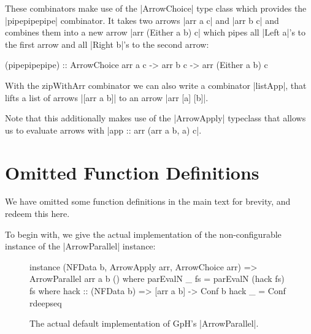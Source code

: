 These combinators make use of the |ArrowChoice| type class which provides the |pipepipepipe| combinator. It takes two arrows |arr a c| and |arr b c| and combines them into a new arrow |arr (Either a b) c| which pipes all |Left a|'s to the first arrow and all |Right b|'s to the second arrow:
\begin{code}
(pipepipepipe) :: ArrowChoice arr a c -> arr b c -> arr (Either a b) c
\end{code}

With the zipWithArr combinator we can also write a combinator |listApp|, that lifts a list of arrows |[arr a b]| to an arrow |arr [a] [b]|.
Note that  this additionally makes use of the |ArrowApply| typeclass that allows us to evaluate arrows with |app :: arr (arr a b, a) c|.


\section{Omitted Function Definitions}
\label{app:omitted}
We have omitted some function definitions in the main text for
brevity, and redeem this here.

To begin with, we give the actual implementation of the non-configurable instance of the |ArrowParallel| instance:

\begin{figure}
\begin{code}
instance (NFData b, ArrowApply arr, ArrowChoice arr) => ArrowParallel arr a b () where
    parEvalN _ fs = parEvalN (hack fs) fs
                    where
                        hack :: (NFData b) => [arr a b] -> Conf b
                        hack _ = Conf rdeepseq
\end{code}
\caption{The actual default implementation of GpH's |ArrowParallel|.}
\label{fig:actualNonConfigMulticore}
\end{figure}

